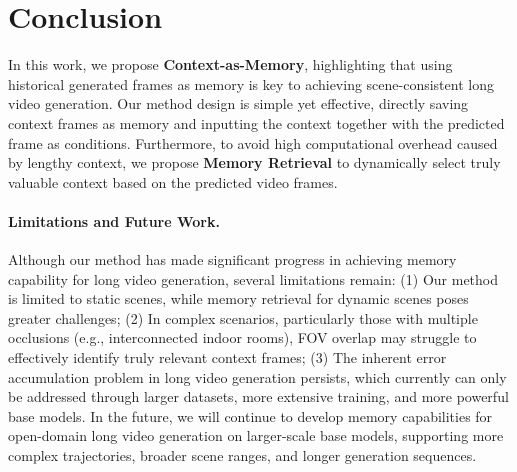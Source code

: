 \section{Conclusion}
In this work, we propose \textbf{Context-as-Memory}, highlighting that using historical generated frames as memory is key to achieving scene-consistent long video generation. Our method design is simple yet effective, directly saving context frames as memory and inputting the context together with the predicted frame as conditions. Furthermore, to avoid high computational overhead caused by lengthy context, we propose \textbf{Memory Retrieval} to dynamically select truly valuable context based on the predicted video frames. 
\paragraph{Limitations and Future Work.}
Although our method has made significant progress in achieving memory capability for long video generation, several limitations remain: (1) Our method is limited to static scenes, while memory retrieval for dynamic scenes poses greater challenges; (2) In complex scenarios, particularly those with multiple occlusions (e.g., interconnected indoor rooms), FOV overlap may struggle to effectively identify truly relevant context frames; (3) The inherent error accumulation problem in long video generation persists, which currently can only be addressed through larger datasets, more extensive training, and more powerful base models. In the future, we will continue to develop memory capabilities for open-domain long video generation on larger-scale base models, supporting more complex trajectories, broader scene ranges, and longer generation sequences.